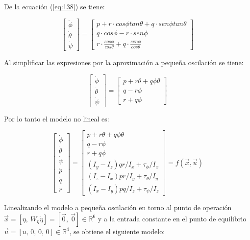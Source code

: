 \documentclass[../main.tex]{subfiles}
\begin{document}
De la ecuación (\ref{eq:138}) se tiene:

\[
\begin{bmatrix}\dot{\phi}\\
\dot{\theta}\\
\dot{\psi}
\end{bmatrix}=\begin{bmatrix}p+r\cdot cos\phi tan\theta+q\cdot sen\phi tan\theta\\
q\cdot cos\phi-r\cdot sen\phi\\
r\cdot\frac{cos\phi}{cos\theta}+q\cdot\frac{sen\phi}{cos\theta}
\end{bmatrix}
\]


Al simplificar las expresiones por la aproximación a pequeña oscilación
se tiene:

\[
\begin{bmatrix}\dot{\phi}\\
\dot{\theta}\\
\dot{\psi}
\end{bmatrix}=\begin{bmatrix}p+r\theta+q\phi\theta\\
q-r\phi\\
r+q\phi
\end{bmatrix}
\]


Por lo tanto el modelo no lineal es:

\[
\begin{bmatrix}\dot{\phi}\\
\dot{\theta}\\
\dot{\psi}\\
\dot{p}\\
\dot{q}\\
\dot{r}
\end{bmatrix}=\begin{bmatrix}p+r\theta+q\phi\theta\\
q-r\phi\\
r+q\phi\\
(I_{y}-I_{z})qr/I_{x}+\tau_{\phi}/I_{x}\\
(I_{z}-I_{x})pr/I_{y}+\tau_{\theta}/I_{y}\\
(I_{x}-I_{y})pq/I_{z}+\tau_{\psi}/I_{z}
\end{bmatrix}=f(\vec{x},\vec{u})
\]

Linealizando el modelo a pequeña oscilación en torno al punto de operación
$\vec{x}=[\eta,\ W_{\eta}\dot{\eta}]=[\vec{0},\ \vec{0}]\in\mathbb{R}^{6}$
y a la entrada constante en el punto de equilibrio $\vec{u}=[u,\,0,\,0,\,0]\in\mathbb{R}^{4}$,
se obtiene el siguiente modelo:
\end{document}
